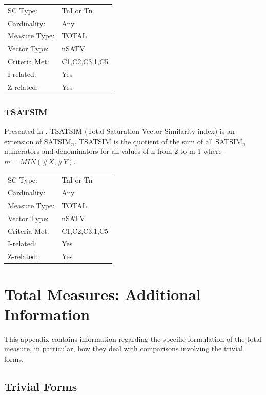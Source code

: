 \documentclass{article}
\begin{document}
\begin{center}
\begin{tabular}{ll}
 SC Type:       &  TnI or Tn      \\
 Cardinality:   &  Any            \\
 Measure Type:  &  TOTAL          \\
 Vector Type:   &  nSATV          \\
 Criteria Met:  &  C1,C2,C3.1,C5  \\
 I-related:     &  Yes            \\
 Z-related:     &  Yes            \\
\end{tabular}
\end{center}
\subsubsection{TSATSIM}
\label{sec-11-10-4}

Presented in \citet[chap. 2.10]{Buchler1997}, TSATSIM (Total
Saturation Vector Similarity index) is an extension of
SATSIM$_{n}$. TSATSIM is the quotient of the sum of all SATSIM$_{n}$
numerators and denominators for all values of n from 2 to m-1 where
$m=MIN(\#X,\#Y)$.

\begin{center}
\begin{tabular}{ll}
 SC Type:       &  TnI or Tn      \\
 Cardinality:   &  Any            \\
 Measure Type:  &  TOTAL          \\
 Vector Type:   &  nSATV          \\
 Criteria Met:  &  C1,C2,C3.1,C5  \\
 I-related:     &  Yes            \\
 Z-related:     &  Yes            \\
\end{tabular}
\end{center}
\section{Total Measures: Additional Information}
\label{sec-12}

This appendix contains information regarding the specific formulation
of the total measure, in particular, how they deal with comparisons
involving the trivial forms.
\subsection{Trivial Forms}
\label{sec-12-1}
\end{document}
